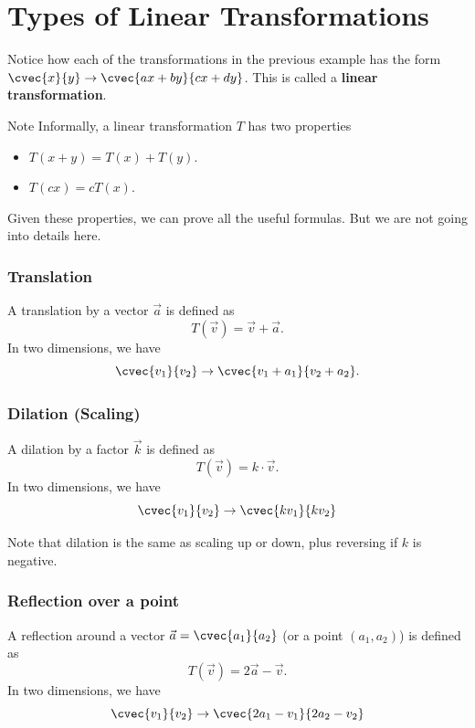 \section[Transformation]{Types of Linear Transformations}
\frame{\sectionpage}

\begin{frame}
Notice how each of the transformations in the previous example has the form $\cvec{x}{y} \to \cvec{ax+by}{cx+dy}$. This is called a \textbf{linear transformation}.
\begin{remark}{Note}
Informally, a linear transformation $T$ has two properties
\begin{itemize}
\item $T(x+y) = T(x) + T(y)$.
\item $T(cx) = cT(x)$.
\end{itemize}
Given these properties, we can prove all the useful formulas. But we are not going into details here.
\end{remark}
\end{frame}


\begin{frame}
\frametitle{Translation}
\begin{defn}{}{}
A translation by a vector $\vec{a}$ is defined as
\[ T(\vec{v}) = \vec{v} + \vec{a}.\]
In two dimensions, we have
\[ \cvec{v_1}{v_2} \to \cvec{v_1+a_1}{v_2+a_2}.\]
\end{defn}
\end{frame}

\begin{frame}
\frametitle{Dilation (Scaling)}
\begin{defn}{}{}
A dilation by a factor $\vec{k}$ is defined as
\[ T(\vec{v}) = k \cdot \vec{v}.\]
In two dimensions, we have
\[ \cvec{v_1}{v_2} \to \cvec{kv_1}{kv_2}\]
\end{defn}
Note that dilation is the same as scaling up or down, plus reversing if $k$ is negative.
\end{frame}

\begin{frame}
\frametitle{Reflection over a point}
\begin{defn}{}{}
A reflection around a vector $\vec{a} = \cvec{a_1}{a_2}$ (or a point $(a_1, a_2)$) is defined as
\[ T(\vec{v}) = 2\vec{a} - \vec{v}.\]
In two dimensions, we have
\[ \cvec{v_1}{v_2} \to \cvec{2a_1-v_1}{2a_2-v_2}\]
\end{defn}
\end{frame}

